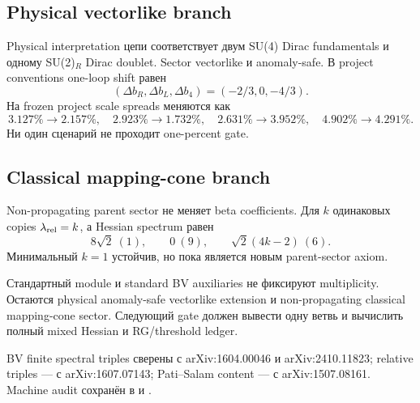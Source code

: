 \subsection{Physical vectorlike branch}

Physical interpretation цепи соответствует двум SU(4) Dirac fundamentals и
одному SU(2)\(_R\) Dirac doublet. Sector vectorlike и anomaly-safe. В project
conventions one-loop shift равен
\begin{equation}
 (\Delta b_R,\Delta b_L,\Delta b_4)=(-2/3,0,-4/3).
\end{equation}
На frozen project scale spreads меняются как
\begin{equation}
 3.127\%\to2.157\%,\quad
 2.923\%\to1.732\%,\quad
 2.631\%\to3.952\%,\quad
 4.902\%\to4.291\%.
\end{equation}
Ни один сценарий не проходит one-percent gate.

\subsection{Classical mapping-cone branch}

Non-propagating parent sector не меняет beta coefficients. Для \(k\)
одинаковых copies \(\lambda_{\rm rel}=k\), а Hessian spectrum равен
\begin{equation}
 8\sqrt2\ (1),\qquad0\ (9),\qquad\sqrt2(4k-2)\ (6).
\end{equation}
Минимальный \(k=1\) устойчив, но пока является новым parent-sector axiom.

\begin{theorem}
Стандартный module и standard BV auxiliaries не фиксируют multiplicity.
Остаются physical anomaly-safe vectorlike extension и non-propagating
classical mapping-cone sector. Следующий gate должен вывести одну ветвь и
вычислить полный mixed Hessian и RG/threshold ledger.
\end{theorem}

BV finite spectral triples сверены с arXiv:1604.00046 и arXiv:2410.11823;
relative triples --- с arXiv:1607.07143; Pati--Salam content --- с
arXiv:1507.08161. Machine audit сохранён в
 и
.